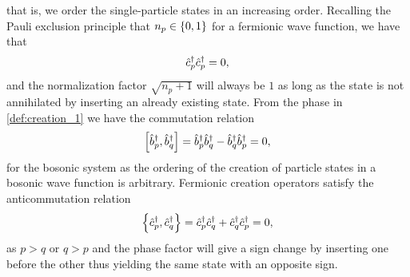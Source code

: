             that is, we order the single-particle states in an increasing order.
            Recalling the Pauli exclusion principle that $n_p \in \left\{ 0, 1 \right\}$
            for a fermionic wave function, we have that
            \begin{align}
                \hat{c}_{p}^{\dagger}\hat{c}_{p}^{\dagger} = 0,
            \end{align}
            and the normalization factor $\sqrt{n_p + 1}$ will always be $1$ as
            long as the state is not annihilated by inserting an already
            existing state.
            From the phase in \autoref{def:creation_1} we have the commutation
            relation
            \begin{gather}
                \left[\hat{b}_{p}^{\dagger}, \hat{b}_{q}^{\dagger}\right] = \hat{b}_{p}^{\dagger}\hat{b}_{q}^{\dagger} - \hat{b}_{q}^{\dagger}\hat{b}_{p}^{\dagger} = 0,
            \end{gather}
            for the bosonic system as the ordering of the creation of particle
            states in a bosonic wave function is arbitrary.
            Fermionic creation operators satisfy the anticommutation relation
            \begin{gather}
                \left\{\hat{c}_{p}^{\dagger}, \hat{c}_{q}^{\dagger}\right\} = \hat{c}_{p}^{\dagger}\hat{c}_{q}^{\dagger} + \hat{c}_{q}^{\dagger}\hat{c}_{p}^{\dagger} = 0,
            \end{gather}
            as $p > q$ or $q > p$ and the phase factor will give a sign change
            by inserting one before the other thus yielding the same state with
            an opposite sign.

